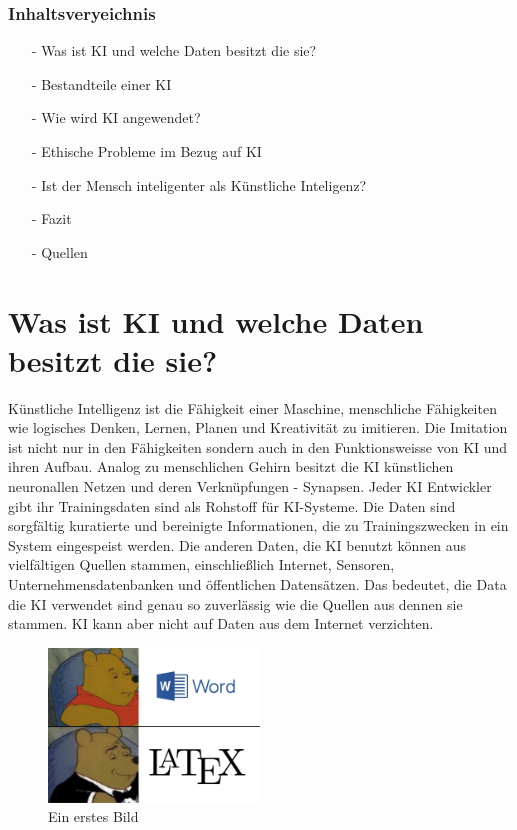 \documentclass{report}
\begin{document}
\subsection{Inhaltsveryeichnis}

\begin{itemize}
\item[-] Was ist KI und welche Daten besitzt die sie?
\item[-] Bestandteile einer KI
\item[-] Wie wird KI angewendet?
\item[-] Ethische Probleme im Bezug auf KI
\item[-] Ist der Mensch inteligenter als Künstliche Inteligenz? 
\item[-] Fazit
\item[-] Quellen 


\end{itemize}

\chapter{Was ist KI und welche Daten besitzt die sie?}

Künstliche Intelligenz ist die Fähigkeit einer Maschine, menschliche Fähigkeiten wie logisches Denken, 
Lernen, Planen und Kreativität zu imitieren. Die Imitation ist nicht nur in den Fähigkeiten sondern auch in den 
Funktionsweisse von KI und ihren Aufbau. Analog zu menschlichen Gehirn besitzt die KI künstlichen neuronallen Netzen und 
deren Verknüpfungen - Synapsen. Jeder KI Entwickler gibt ihr Trainingsdaten sind als Rohstoff für KI-Systeme. Die Daten sind sorgfältig 
kuratierte und bereinigte Informationen, die zu Trainingszwecken in ein System eingespeist werden.
Die anderen Daten, die KI benutzt können aus vielfältigen Quellen stammen, einschließlich Internet, Sensoren,
  Unternehmensdatenbanken und öffentlichen Datensätzen. Das bedeutet, die Data die KI verwendet sind genau so zuverlässig wie die Quellen aus dennen sie stammen.
KI kann aber nicht auf Daten aus dem Internet verzichten.  


\begin{figure}[h]
  \centering 
  \includegraphics[width=0.5\textwidth]{meme.jpg} 
  \caption{Ein erstes Bild}
  \label{fig:meme}
  \end{figure}
\end{document}
